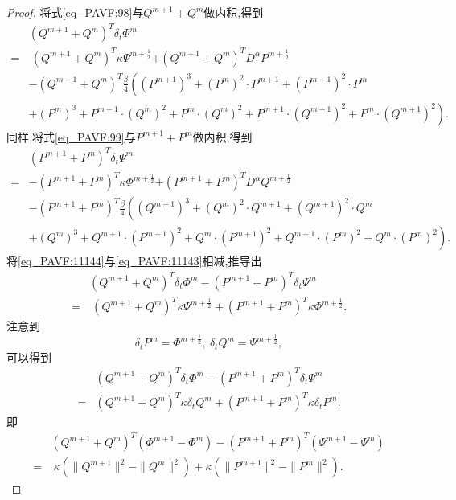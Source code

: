 \begin{proof}
将式\eqref{eq_PAVF:98}与$Q^{m+1}+Q^{m}$做内积,得到
\begin{align}
&(Q^{m+1}+Q^{m})^{T}\delta_{t} \varPhi^{m}\nonumber\\
=&~(Q^{m+1}+Q^{m})^{T}\kappa \Psi^{m+\frac{1}{2}}{+(Q^{m+1}+Q^{m})^{T}D^{\alpha} P^{m+\frac{1}{2}}}\nonumber\\
&-(Q^{m+1}+Q^{m})^{T}\frac{\beta}{4}\left((P^{m+1})^3+(P^{m})^{2}\cdot P^{m+1}+(P^{m+1})^{2}\cdot P^{m}\right.\nonumber\\
&\left.+(P^{m})^{3}+P^{m+1}\cdot (Q^{m})^{2}+P^{m}\cdot (Q^{m})^{2}+P^{m+1}\cdot (Q^{m+1})^{2}+P^{m}\cdot (Q^{m+1})^{2}\right).\label{eq_PAVF:11143}
\end{align}
同样,将式\eqref{eq_PAVF:99}与$P^{m+1}+P^{m}$做内积,得到
\begin{align}
&(P^{m+1}+P^{m})^{T}\delta_{t} \Psi^{m}\nonumber\\
=&-(P^{m+1}+P^{m})^{T}\kappa \varPhi^{m+\frac{1}{2}}{+(P^{m+1}+P^{m})^{T}D^{\alpha} Q^{m+\frac{1}{2}}}\nonumber\\
&-(P^{m+1}+P^{m})^{T}\frac{\beta}{4}\left((Q^{m+1})^3+(Q^{m})^{2}\cdot Q^{m+1}+(Q^{m+1})^{2}\cdot Q^{m}\right.\nonumber\\
&\left.+(Q^{m})^{3}+Q^{m+1}\cdot (P^{m+1})^{2}+Q^{m}\cdot (P^{m+1})^{2}+Q^{m+1}\cdot (P^{m})^{2}+Q^{m}\cdot (P^{m})^{2}\right).\label{eq_PAVF:11144}
\end{align}
将\eqref{eq_PAVF:11144}与\eqref{eq_PAVF:11143}相减,推导出
\begin{align}
&(Q^{m+1}+Q^{m})^{T}\delta_{t} \varPhi^{m}-(P^{m+1}+P^{m})^{T}\delta_{t} \Psi^{m}\nonumber\\
=&~(Q^{m+1}+Q^{m})^{T}\kappa \Psi^{m+\frac{1}{2}}+(P^{m+1}+P^{m})^{T}\kappa \varPhi^{m+\frac{1}{2}}.\label{eq_PAVF:11145}
\end{align}
注意到
$$\delta_t P^m=\varPhi^{m+\frac{1}{2}},~\delta_t Q^m=\Psi^{m+\frac{1}{2}},$$
可以得到
\begin{align}\label{eq_PAVF:11146}
&(Q^{m+1}+Q^{m})^{T}\delta_{t} \varPhi^{m}\!-\!(P^{m+1}+P^{m})^{T}\delta_{t} \Psi^{m}\nonumber\\
=&(Q^{m+1}+Q^{m})^{T}\kappa \delta_t Q^m+(P^{m+1}+P^{m})^{T}\kappa \delta_t P^m.
\end{align}
即
\begin{align}
&(Q^{m+1}+Q^{m})^{T}(\varPhi^{m+1}-\varPhi^{m})-(P^{m+1}+P^{m})^{T}(\Psi^{m+1}-\Psi^{m})\nonumber\\
=&~\kappa (\|Q^{m+1}\|^2-\|Q^{m}\|^2)+\kappa (\|P^{m+1}\|^2-\|P^{m}\|^2).\label{eq_PAVF:11147}

\end{align}
\end{proof}
